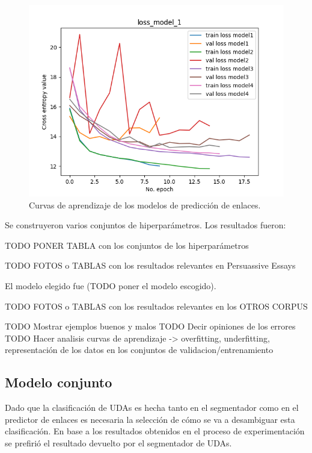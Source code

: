 \begin{figure}[h!]
	\begin{center}
		\includegraphics[scale=.9]{Graphics/persuassive_essays_all_linked_link_prediction_loss_model_1.png}
	    \caption{Curvas de aprendizaje de los modelos de predicción de enlaces.}\label{fig:link_prediction_model_loss}
	\end{center}
\end{figure}

Se construyeron varios conjuntos de hiperparámetros. Los resultados fueron:

TODO PONER TABLA con los conjuntos de los hiperparámetros

TODO FOTOS o TABLAS con los resultados relevantes en Persuassive Essays 

El modelo elegido fue (TODO poner el modelo escogido).

TODO FOTOS o TABLAS con los resultados relevantes en los OTROS CORPUS

TODO Mostrar ejemplos buenos y malos
TODO Decir opiniones de los errores
TODO Hacer analisis curvas de aprendizaje -> overfitting, underfitting, representación de los datos en los conjuntos de validacion/entrenamiento

\subsection{Modelo conjunto}

Dado que la clasificación de UDAs es hecha tanto en el segmentador como en el predictor de enlaces es necesaria 
la selección de cómo se va a desambiguar esta clasificación. En base a los resultados obtenidos en el proceso
de experimentación se prefirió el resultado devuelto por el segmentador de UDAs.

